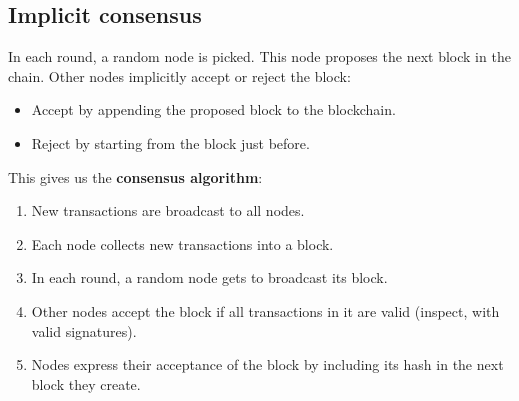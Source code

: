 \documentclass[12pt]{article}
\begin{document}
\subsection*{Implicit consensus}

In each round, a random node is picked. This node proposes the next block in the chain. Other nodes implicitly accept or reject the block:
\begin{itemize}
\item Accept by appending the proposed block to the blockchain.
\item Reject by starting from the block just before.
\end{itemize}

This gives us the \textbf{consensus algorithm}:
\begin{enumerate}
\item New transactions are broadcast to all nodes.
\item Each node collects new transactions into a block.
\item In each round, a random node gets to broadcast its block.
\item Other nodes accept the block if all transactions in it are valid (inspect, with valid signatures).
\item Nodes express their acceptance of the block by including its hash in the next block they create.
\end{enumerate}
\end{document}
